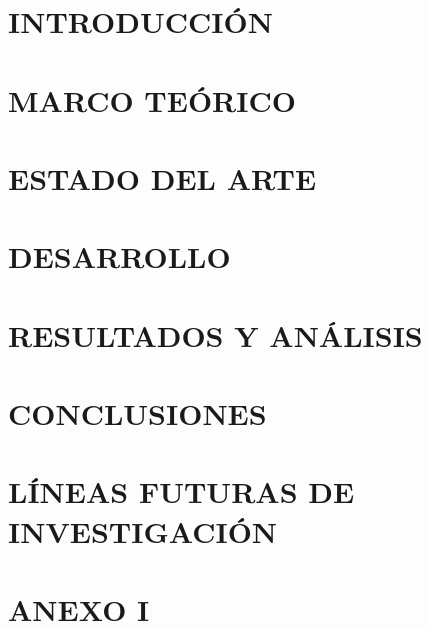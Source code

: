 \documentclass[12pt]{article}
\begin{document}
\clearpage %
\section{INTRODUCCIÓN} 



\clearpage

\newpage
\section{MARCO TEÓRICO} 
    

\newpage
\section{ESTADO DEL ARTE} 
    

\newpage
\section{DESARROLLO} 
    

\newpage
\section{RESULTADOS Y ANÁLISIS} 
    


\newpage
\section{CONCLUSIONES} 
    

\newpage
\section{LÍNEAS FUTURAS DE INVESTIGACIÓN} 
    

\newpage

\printbibliography[title={BIBLIOGRAFÍA}, heading=bibintoc]

\newpage
\appendix
\section*{ANEXO I} 
    
  
\end{document}
